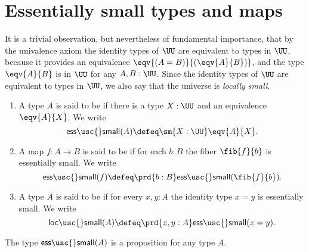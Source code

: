 \section{Essentially small types and maps}
It is a trivial observation, but nevertheless of fundamental importance, that by the univalence axiom the identity types of $\UU$ are equivalent to types in $\UU$, because it provides an equivalence $\eqv{(A=B)}{(\eqv{A}{B})}$, and the type $\eqv{A}{B}$ is in $\UU$ for any $A,B:\UU$. Since the identity types of $\UU$ are equivalent to types in $\UU$, we also say that the universe is \emph{locally small}.

\begin{defn}
\begin{enumerate}
\item A type $A$ is said to be  if there is a type $X:\UU$ and an equivalence $\eqv{A}{X}$. We write
\begin{equation*}
\mathsf{ess\usc{}small}(A)\defeq\sm{X:\UU}\eqv{A}{X}.
\end{equation*}
\item A map $f:A\to B$ is said to be  if for each $b:B$ the fiber $\fib{f}{b}$ is essentially small.
We write
\begin{equation*}
\mathsf{ess\usc{}small}(f)\defeq\prd{b:B}\mathsf{ess\usc{}small}(\fib{f}{b}).
\end{equation*}
\item A type $A$ is said to be  if for every $x,y:A$ the identity type $x=y$ is essentially small.
We write
\begin{equation*}
\mathsf{loc\usc{}small}(A)\defeq \prd{x,y:A}\mathsf{ess\usc{}small}(x=y).
\end{equation*}
\end{enumerate}
\end{defn}

\begin{lem}
The type $\mathsf{ess\usc{}small}(A)$ is a proposition for any type $A$.
\end{lem}

